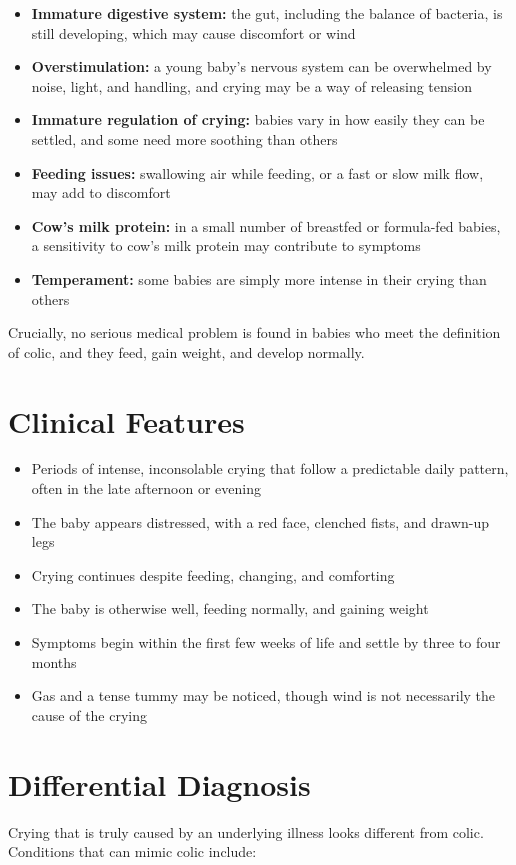 \begin{itemize}
    \item \textbf{Immature digestive system:} the gut, including the balance of bacteria, is still developing, which may cause discomfort or wind
    \item \textbf{Overstimulation:} a young baby's nervous system can be overwhelmed by noise, light, and handling, and crying may be a way of releasing tension
    \item \textbf{Immature regulation of crying:} babies vary in how easily they can be settled, and some need more soothing than others
    \item \textbf{Feeding issues:} swallowing air while feeding, or a fast or slow milk flow, may add to discomfort
    \item \textbf{Cow's milk protein:} in a small number of breastfed or formula-fed babies, a sensitivity to cow's milk protein may contribute to symptoms
    \item \textbf{Temperament:} some babies are simply more intense in their crying than others
\end{itemize}

Crucially, no serious medical problem is found in babies who meet the definition of colic, and they feed, gain weight, and develop normally.

\section*{Clinical Features}
\begin{itemize}
    \item Periods of intense, inconsolable crying that follow a predictable daily pattern, often in the late afternoon or evening
    \item The baby appears distressed, with a red face, clenched fists, and drawn-up legs
    \item Crying continues despite feeding, changing, and comforting
    \item The baby is otherwise well, feeding normally, and gaining weight
    \item Symptoms begin within the first few weeks of life and settle by three to four months
    \item Gas and a tense tummy may be noticed, though wind is not necessarily the cause of the crying
\end{itemize}

\section*{Differential Diagnosis}
Crying that is truly caused by an underlying illness looks different from colic. Conditions that can mimic colic include:

